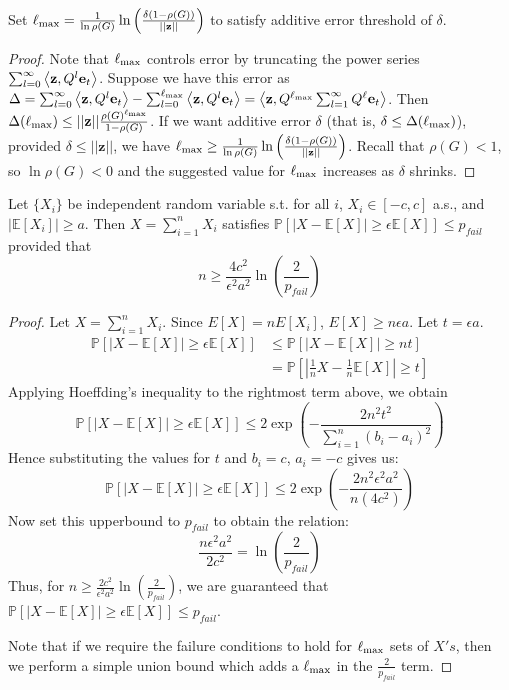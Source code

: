 \begin{lemma}
Set $\ell_{\max} = \frac{1}{\ln \rho(G)} \ln \left(\frac{\delta(1 - \rho(G))}{||\mathbf{z}||} \right)$  to satisfy additive error threshold of $\delta$.
\end{lemma}
\begin{proof}
Note that $\ell_{\max}$ controls error by truncating the power series $\sum_{l=0}^\infty \left< \mathbf{z}, Q^l\mathbf{e}_t \right>$.
Suppose we have this error as $\Delta =\sum_{l=0}^\infty \left< \mathbf{z}, Q^l\mathbf{e}_t \right> - \sum_{l=0}^{\ell_{\max}} \left< \mathbf{z}, Q^l\mathbf{e}_t \right> = \left< \mathbf{z}, Q^{\ell_{\max}} \sum_{l=1}^\infty Q^{\ell} \mathbf{e}_t \right>$.
Then $\Delta(\ell_{\max}) \leq ||\mathbf{z}|| \frac{\rho(G)^{\ell_{\max}}}{1 - \rho(G)}$.
If we want additive error $\delta$ (that is, $ \delta \leq \Delta(\ell_{\max})$), provided $\delta \leq ||\mathbf{z}||$, we have
$\ell_{\max} \geq \frac{1}{\ln \rho(G)} \ln \left(\frac{\delta(1 - \rho(G))}{||\mathbf{z}||} \right)$.
Recall that $\rho(G) < 1$, so $\ln \rho(G) < 0$ and the suggested value for $\ell_{\max}$ increases as $\delta$ shrinks.
\end{proof}

\begin{lemma} 
Let $\{X_i\}$ be independent random variable s.t. for all $i$, $X_i \in [-c, c]$ a.s., and $|\mathbb{E}[X_i]| \geq a$. 
Then $X = \sum_{i= 1}^n X_i$ satisfies
$\mathbb{P}[|X - \mathbb{E}[X]| \geq \epsilon \mathbb{E}[X] ] \leq p_{fail}$ provided that
$$n \geq \frac{4c^2}{\epsilon^2 a^2}\ln\left(\frac{2}{p_{fail}} \right)$$
\end{lemma}

\begin{proof}
Let $X = \sum_{i=1}^n X_i$.  Since $E[X] = nE[X_i]$, $E[X] \geq n \epsilon a$. Let $t = \epsilon a$.
\begin{align*}
\mathbb{P}\left[|X - \mathbb{E}[X]| \geq \epsilon \mathbb{E}[X] \right] 
&\leq \mathbb{P}\left[|X - \mathbb{E}[X]| \geq nt \right] \\
&= \mathbb{P}\left[\left|\frac{1}{n}X - \frac{1}{n}\mathbb{E}[X]\right| \geq t \right]  
\end{align*}
Applying Hoeffding's inequality to the rightmost term above, we obtain
  \[\mathbb{P}\left[|X - \mathbb{E}[X]| \geq \epsilon \mathbb{E}[X] \right] \leq 2\exp \left(-\frac{2n^2t^2}{\sum_{i=1}^n(b_i - a_i)^2}\right) \]
  Hence substituting the values for $t$ and $b_i = c$, $a_i = -c$ gives us:
\[\mathbb{P}\left[|X - \mathbb{E}[X]| \geq \epsilon \mathbb{E}[X] \right] \leq 2\exp \left(-\frac{2n^2\epsilon^2a^2}{n(4c^2)}\right) \]
Now set this upperbound to $p_{fail}$ to obtain the relation:
$$ \frac{n \epsilon^2 a^2}{2c^2} = \ln\left(\frac{2}{p_{fail}} \right) $$
Thus, for $n \geq \frac{2c^2}{\epsilon^2 a^2}\ln\left(\frac{2}{p_{fail}} \right)$, we are guaranteed that $\mathbb{P}\left[|X - \mathbb{E}[X]| \geq \epsilon \mathbb{E}[X] \right] \leq p_{fail}$.

Note that if we require the failure conditions to hold for $\ell_{\max}$ sets of $X's$, then we perform a simple union bound which adds a $\ell_{\max}$ in the $\frac{2}{p_{fail}}$ term.
\end{proof} 

